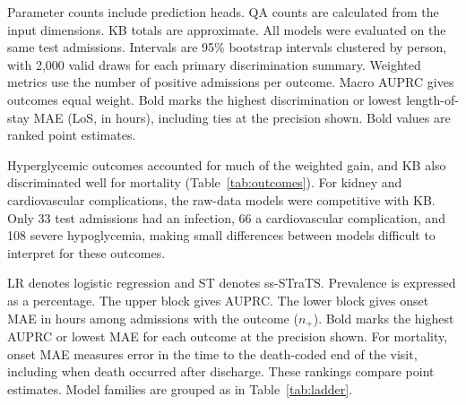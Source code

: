 \begin{table}[htbp]
\centering\small
\caption{Predictive discrimination and length-of-stay error at the four-day observation cutoff.}
\label{tab:ladder}
\resizebox{\textwidth}{!}{}
\par\smallskip\parbox{\textwidth}{\footnotesize Parameter counts include prediction heads. QA counts are calculated from the input dimensions. KB totals are approximate. All models were evaluated on the same test admissions. Intervals are 95\% bootstrap intervals clustered by person, with 2,000 valid draws for each primary discrimination summary. Weighted metrics use the number of positive admissions per outcome. Macro AUPRC gives outcomes equal weight. Bold marks the highest discrimination or lowest length-of-stay MAE (LoS, in hours), including ties at the precision shown. Bold values are ranked point estimates.}
\end{table}

Hyperglycemic outcomes accounted for much of the weighted gain, and KB also discriminated well for mortality (Table~\ref{tab:outcomes}). For kidney and cardiovascular complications, the raw-data models were competitive with KB. Only 33 test admissions had an infection, 66 a cardiovascular complication, and 108 severe hypoglycemia, making small differences between models difficult to interpret for these outcomes.

\begin{table}[htbp]
\centering\scriptsize
\caption{Per-outcome discrimination and complication-onset error.}
\label{tab:outcomes}
\resizebox{\textwidth}{!}{}
\par\smallskip\parbox{\textwidth}{\footnotesize LR denotes logistic regression and ST denotes ss-STraTS. Prevalence is expressed as a percentage. The upper block gives AUPRC. The lower block gives onset MAE in hours among admissions with the outcome ($n_+$). Bold marks the highest AUPRC or lowest MAE for each outcome at the precision shown. For mortality, onset MAE measures error in the time to the death-coded end of the visit, including when death occurred after discharge. These rankings compare point estimates. Model families are grouped as in Table~\ref{tab:ladder}.}
\end{table}
